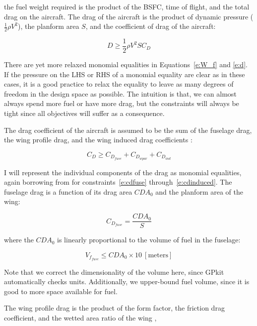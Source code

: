 the fuel weight required is the product of the BSFC, time of flight, and the
total drag on the aircraft.
The drag of the aircraft is the product of dynamic pressure ($\frac{1}{2} \rho V^2$),
the planform area $S$, and the coefficient of drag of the aircraft:

\begin{equation}
    D \geq \frac{1}{2} \rho V^2 S C_D
    \label{e:d}
\end{equation}

There are yet more relaxed monomial equalities in Equations~\ref{e:W_f} and \ref{e:d}.
If the pressure on the \gls{LHS} or \gls{RHS} of a monomial equality are clear as in these cases,
it is a good practice to relax the equality to leave as many degrees of freedom
in the design space as possible. The intuition is that, we can almost always spend more fuel or have more drag,
but the constraints will always be tight since all objectives will suffer as a consequence.

The drag coefficient of the aircraft is assumed to be the sum of the fuselage drag,
the wing profile drag, and the wing induced drag coefficients \cite{gp_ac_design}:

\begin{equation}
    C_D \geq C_{D_{fuse}} + C_{D_{wpar}} + C_{D_{ind}}
\label{e:cd}
\end{equation}

I will represent the individual components of the drag as monomial equalities, again borrowing
from \cite{gp_ac_design} for constraints~\ref{e:cdfuse} through~\ref{e:cdinduced}.
The fuselage drag is a function of its drag area $CDA_0$ and the planform area of the wing:

\begin{equation}
    C_{D_{fuse}} = \frac{CDA_0}{S}
\label{e:cdfuse}
\end{equation}

where the $CDA_0$ is linearly proportional to the volume of fuel in the fuselage:

\begin{equation}
    V_{f_{fuse}} \leq CDA_0 \times 10 ~\mathrm{[meters]}
\label{e:vffuse}
\end{equation}

Note that we correct the dimensionality of the volume here, since GPkit automatically checks units.
Additionally, we upper-bound fuel volume, since it is good to more space available for fuel.

The wing profile drag is the product of the form factor, the friction drag coefficient,
and the wetted area ratio of the wing \cite{gp_ac_design},

